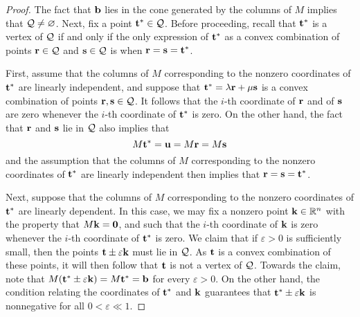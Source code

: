 \documentclass[11pt]{amsart}
\begin{document}
\begin{proof}  The fact that $\mathbf{b}$ lies in the cone generated by the columns of $M$ implies that $\mathcal{Q} \neq  \varnothing$.  Next, fix a point $\mathbf{t}^{\ast} \in \mathcal{Q}$.  Before proceeding, recall that $\mathbf{t}^{\ast}$ is a vertex of $\mathcal{Q}$ if and only if the only expression of $\mathbf{t}^{\ast}$ as a convex combination of points $\mathbf{r} \in \mathcal{Q}$ and $\mathbf{s} \in \mathcal{Q}$ is when $\mathbf{r}=\mathbf{s}=\mathbf{t}^{\ast}$.

First, assume that the columns of $M$ corresponding to the nonzero coordinates of $\mathbf{t}^{\ast}$ are linearly independent, and suppose that $\mathbf{t}^{\ast} = \lambda \mathbf{r} + \mu \mathbf{s}$ is a convex combination of points $\mathbf{r}, \mathbf{s} \in \mathcal{Q}$.  It follows that the $i$-th coordinate of $\mathbf{r}$ and of $\mathbf{s}$ are zero whenever the $i$-th coordinate of $\mathbf{t}^{\ast}$ is zero.  On the other hand, the fact that $\mathbf{r}$ and $\mathbf{s}$ lie in $\mathcal{Q}$ also implies that 
\[ M \mathbf{t}^{\ast} = \mathbf{u} = M \mathbf{r} = M \mathbf{s} \] 
and the assumption that the columns of $M$ corresponding to the nonzero coordinates of $\mathbf{t}^{\ast}$ are linearly independent then implies that $\mathbf{r}=\mathbf{s}=\mathbf{t}^{\ast}$.

Next, suppose that the columns of $M$ corresponding to the nonzero coordinates of $\mathbf{t}^{\ast}$ are linearly dependent.   In this case, we may fix a nonzero point $\mathbf{k} \in \mathbb{R}^n$ with the property that $M \mathbf{k} = \mathbf{0}$, and such that the $i$-th coordinate of $\mathbf{k}$ is zero whenever the $i$-th coordinate of $\mathbf{t}^{\ast}$ is zero.  We claim that if $\varepsilon > 0$ is sufficiently small, then the points $\mathbf{t} \pm \varepsilon \mathbf{k}$ must lie in $\mathcal{Q}$.   As $\mathbf{t}$ is a convex combination of these points, it will then follow that $\mathbf{t}$ is not a vertex of $\mathcal{Q}$.  Towards the claim, note that $M(\mathbf{t}^{\ast} \pm \varepsilon \mathbf{k}) = M \mathbf{t}^{\ast} = \mathbf{b}$ for every $\varepsilon > 0$.  On the other hand, the condition relating the coordinates of $\mathbf{t}^{\ast}$ and $\mathbf{k}$ guarantees that $\mathbf{t}^{\ast} \pm \varepsilon \mathbf{k}$ is nonnegative for all $0 < \varepsilon \ll 1$.  
%
\end{proof}
\end{document}

